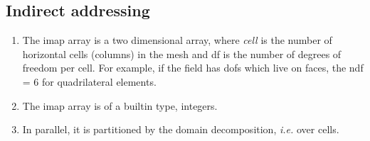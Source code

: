 \documentclass[a4paper,11pt]{report}
\begin{document}
\subsection{Indirect addressing}
  \begin{enumerate}  
     \item The imap array is a two dimensional array, where {\em cell} is the
       number of horizontal cells (columns) in the mesh and df is the
       number of degrees of freedom per cell. For example, if the
       field has dofs which live on faces, the ndf = 6 for
       quadrilateral elements.
     \item The imap array is of a builtin type, integers.
     \item In parallel, it is partitioned by the domain
       decomposition, {\em i.e.} over cells.
  \end{enumerate}
\end{document}
